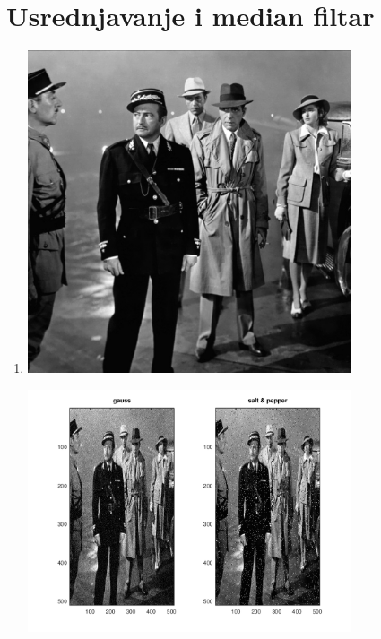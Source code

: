 \documentclass[12pt, a4]{report}
\begin{document}
        \section{Usrednjavanje i median filtar}
            \begin{enumerate}
                \item
                    \begin{minipage}{\linewidth}
                        \centering
                        \includegraphics[width=0.75\textwidth]{casablanca}
                    \end{minipage}
                    \begin{minipage}{\linewidth}
                        \centering
                        \includegraphics[width=0.75\textwidth]{noise}

\end{minipage}
\end{enumerate}
\end{document}
